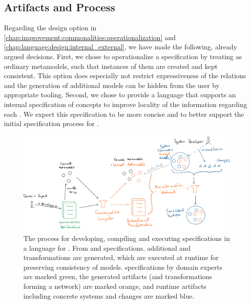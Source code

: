 \subsection{Artifacts and Process}

Regarding the design option in \autoref{chap:improvement:commonalities:operationalization} and \autoref{chap:language:design:internal_external}, we have made the following, already argued decisions.
First, we chose to operationalize a specification by treating \conceptmetamodels as ordinary metamodels, such that instances of them are created and kept consistent.
This option does especially not restrict expressiveness of the relations and the generation of additional models can be hidden from the user by appropriate tooling.
Second, we chose to provide a language that supports an internal specification of concepts to improve locality of the information regarding each \commonality.
We expect this specification to be more concise and to better support the initial specification process for \commonalities.

\begin{figure}
    \centering
    \includegraphics[width=\textwidth]{figures/quality/language/overall_process.png}
    \caption[Process and artifacts using a language for \commonalities]{The process for developing, compiling and executing specifications in a language for \commonalities. From \concretemetamodels and \commonalities specifications, additional \conceptmetamodels and transformations are generated, which are executed at runtime for preserving consistency of models.
    \Commonalities specifications by domain experts are marked green, the generated artifacts (\conceptmetamodels and transformations forming a network) are marked orange, and runtime artifacts including concrete systems and changes are marked blue.}
    \label{fig:language:process}
\end{figure}

